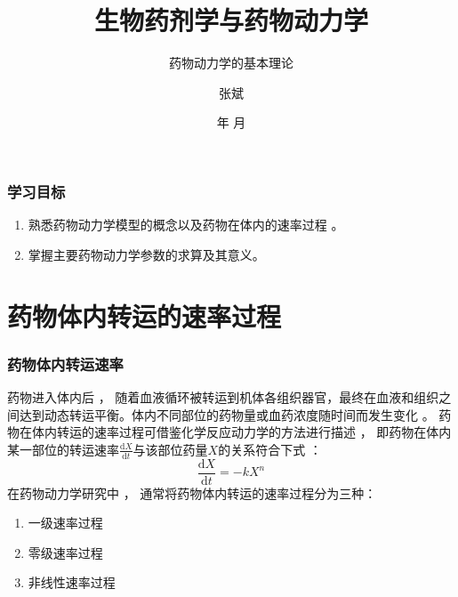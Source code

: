 \documentclass[dvipsnames, svgnames, x11names]{beamer}
\title{生物药剂学与药物动力学}
\subtitle{药物动力学的基本理论}
\author{张斌}
\institute[理工系]{河北农业大学 理工系}
\date{\the\year 年 \the\month 月}
\begin{document}
	
\maketitle


\begin{frame}
	\frametitle{学习目标}
	\begin{enumerate}
	  \item 熟悉药物动力学模型的概念以及药物在体内的速率过程 。
	  \item 掌握主要药物动力学参数的求算及其意义。
	\end{enumerate}
\end{frame}


\begin{frame}{}
	\begin{center}
		{\Huge {}}
	\end{center}
	\tableofcontents[subsectionstyle=hide/hide/show]
	\thispagestyle{empty}
	\addtocounter{framenumber}{-1}
\end{frame}


\section{药物体内转运的速率过程}


\begin{frame}
    \frametitle{药物体内转运速率}
	药物进入体内后 ， 随着血液循环被转运到机体各组织器官，最终在血液和组织之间达到动态转运平衡。体内不同部位的药物量或血药浓度随时间而发生变化 。 药物在体内转运的速率过程可借鉴化学反应动力学的方法进行描述 ， 即药物在体内某一部位的转运速率$\frac{\mathrm{d}X}{\mathrm{d}t}$与该部位药量$X$的关系符合下式 ：
	\[
		\frac{\mathrm{d}X}{\mathrm{d}t}=-kX^n
	\]
	在药物动力学研究中 ， 通常将药物体内转运的速率过程分为三种：
	\begin{enumerate}
	  \item 一级速率过程
	  \item 零级速率过程
	  \item 非线性速率过程
	\end{enumerate}
\end{frame}
\end{document}
